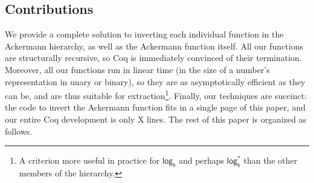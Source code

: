 \subsection{Contributions}
 We provide a complete solution to inverting each individual function in the Ackermann hierarchy,
as well as the Ackermann function itself.  All our functions are structurally recursive, so
Coq is immediately convinced of their termination.  Moreover, all our functions run in linear
time (in the size of a number's representation in unary or binary), so they are as asymptotically efficient as they can be, and are thus suitable for extraction\footnote{A criterion more useful in practice for $\mathsf{log}_b$ and perhaps $\mathsf{log}^*_b$ than the other members of the hierarchy.}.  Finally, our techniques are succinct: the code to invert the Ackermann function fits in a single page of this paper, and our entire Coq development is only {\color{red} X} lines. The rest of this paper is organized as follows.
